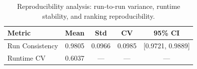 \begin{table}[t]
\centering
\caption{Reproducibility analysis: run-to-run variance, runtime stability, and ranking reproducibility.}
\label{tab:reproducibility}
\begin{tabular}{lcccc}
\toprule
Metric & Mean & Std & CV & 95\% CI \\
\midrule
Run Consistency & 0.9805 & 0.0966 & 0.0985 & [0.9721, 0.9889] \\
Runtime CV & 0.6037 & --- & --- & --- \\
\bottomrule
\end{tabular}
\end{table}
